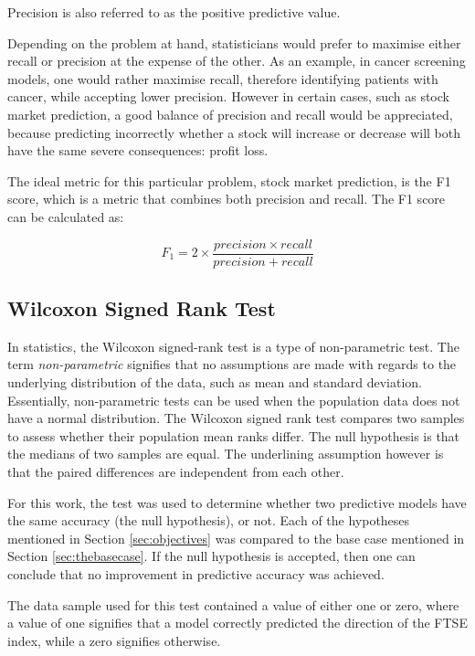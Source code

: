 \documentclass{UoYCSproject}
\begin{document}
Precision is also referred to as the positive predictive value.

Depending on the problem at hand, statisticians would prefer to maximise either recall or precision at the expense of the other. As an example, in cancer screening models, one would rather maximise recall, therefore identifying patients with cancer, while accepting lower precision. However in certain cases, such as stock market prediction, a good balance of precision and recall would be appreciated, because predicting incorrectly whether a stock will increase or decrease will both have the same severe consequences: profit loss.

The ideal metric for this particular problem, stock market prediction, is the F1 score, which is a metric that combines both precision and recall. The F1 score can be calculated as:

\begin{equation}
\label{eq:f1}
F_1=2 \times \frac{precision \times recall}{precision + recall}
\end{equation}

\subsection{Wilcoxon Signed Rank Test} 
In statistics, the Wilcoxon signed-rank test is a type of non-parametric test. The term \textit{non-parametric} signifies that no assumptions are made with regards to the underlying distribution of the data, such as mean and standard deviation. Essentially, non-parametric tests can be used when the population data does not have a normal distribution. The Wilcoxon signed rank test compares two samples to assess whether their population mean ranks differ. The null hypothesis is that the medians of two samples are equal. The underlining assumption however is that the paired differences are independent from each other.

For this work, the test was used to determine whether two predictive models have the same accuracy (the null hypothesis), or not. Each of the hypotheses mentioned in Section \ref{sec:objectives} was compared to the base case mentioned in Section \ref{sec:thebasecase}. If the null hypothesis is accepted, then one can conclude that no improvement in predictive accuracy was achieved. 

The data sample used for this test contained a value of either one or zero, where a value of one signifies that a model correctly predicted the direction of the FTSE index, while a zero signifies otherwise.
\end{document}
